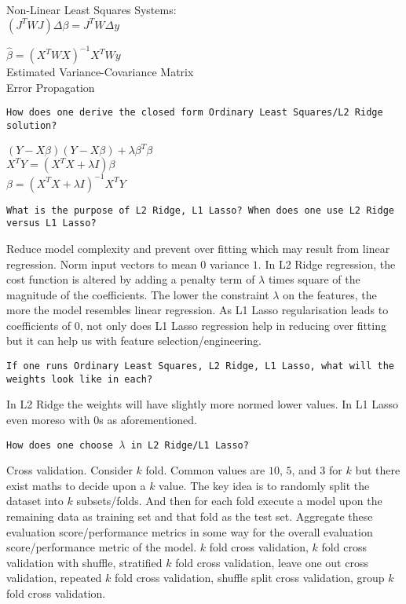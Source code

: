 Non-Linear Least Squares Systems: \\
$(J^T W J)\Delta \beta=J^T W \Delta y$

$\hat{\beta}=(X^T W X)^{-1} X^T W y$ \\
Estimated Variance-Covariance Matrix \\
Error Propagation

\texttt{How does one derive the closed form Ordinary Least Squares/L2 Ridge solution?}

$(Y-X \beta)(Y-X \beta)+\lambda \beta^T \beta$ \\
$X^T Y=(X^T X+\lambda I)\beta$ \\
$\beta=(X^T X+\lambda I)^{-1} X^T Y$

\texttt{What is the purpose of L2 Ridge, L1 Lasso? When does one use L2 Ridge versus L1 Lasso?}

Reduce model complexity and prevent over fitting which may result from linear regression. Norm input vectors to mean $0$ variance $1$. In L2 Ridge regression, the cost function is altered by adding a penalty term of $\lambda$ times square of the magnitude of the coefficients. The lower the constraint $\lambda$ on the features, the more the model resembles linear regression. As L1 Lasso regularisation leads to coefficients of $0$, not only does L1 Lasso regression help in reducing over fitting but it can help us with feature selection/engineering.

\texttt{If one runs Ordinary Least Squares, L2 Ridge, L1 Lasso, what will the weights look like in each?}

In L2 Ridge the weights will have slightly more normed lower values. In L1 Lasso even moreso with $0$s as aforementioned.

\texttt{How does one choose $\lambda$ in L2 Ridge/L1 Lasso?}

Cross validation. Consider $k$ fold. Common values are $10$, $5$, and $3$ for $k$ but there exist maths to decide upon a $k$ value. The key idea is to randomly split the dataset into $k$ subsets/folds. And then for each fold execute a model upon the remaining data as training set and that fold as the test set. Aggregate these evaluation score/performance metrics in some way for the overall evaluation score/performance metric of the model. $k$ fold cross validation, $k$ fold cross validation with shuffle, stratified $k$ fold cross validation, leave one out cross validation, repeated $k$ fold cross validation, shuffle split cross validation, group $k$ fold cross validation.

